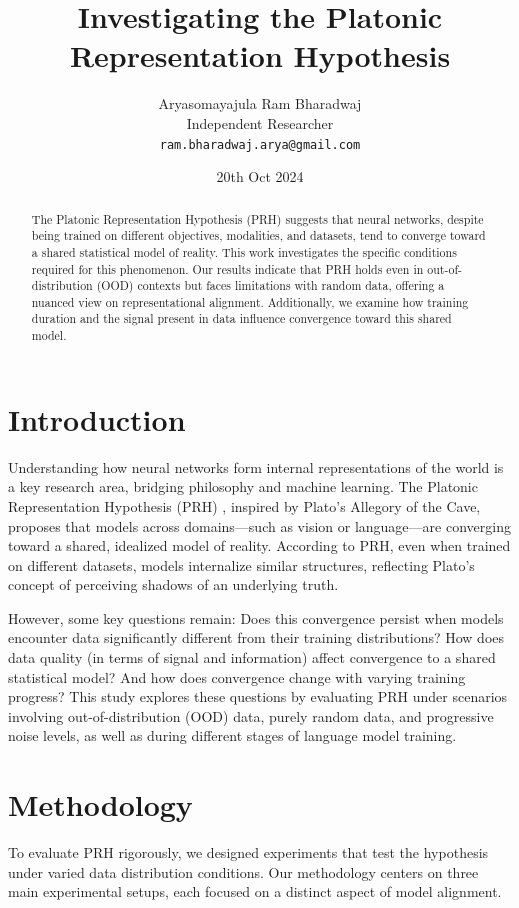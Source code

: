 \documentclass[10pt,a4paper]{article}
\title{Investigating the Platonic Representation Hypothesis}
\author{Aryasomayajula Ram Bharadwaj\\
Independent Researcher\\
\texttt{ram.bharadwaj.arya@gmail.com}}
\date{20th Oct 2024}
\begin{document}
\maketitle

\begin{abstract}
The Platonic Representation Hypothesis (PRH) \cite{huh2024prh} suggests that neural networks, despite being trained on different objectives, modalities, and datasets, tend to converge toward a shared statistical model of reality. This work investigates the specific conditions required for this phenomenon. Our results indicate that PRH holds even in out-of-distribution (OOD) contexts but faces limitations with random data, offering a nuanced view on representational alignment. Additionally, we examine how training duration and the signal present in data influence convergence toward this shared model.
\end{abstract}

\section{Introduction}
Understanding how neural networks form internal representations of the world is a key research area, bridging philosophy and machine learning. The Platonic Representation Hypothesis (PRH) \cite{huh2024prh}, inspired by Plato’s Allegory of the Cave, proposes that models across domains—such as vision or language—are converging toward a shared, idealized model of reality. According to PRH, even when trained on different datasets, models internalize similar structures, reflecting Plato’s concept of perceiving shadows of an underlying truth.

However, some key questions remain: Does this convergence persist when models encounter data significantly different from their training distributions? How does data quality (in terms of signal and information) affect convergence to a shared statistical model? And how does convergence change with varying training progress? This study explores these questions by evaluating PRH under scenarios involving out-of-distribution (OOD) data, purely random data, and progressive noise levels, as well as during different stages of language model training.

\section{Methodology}
To evaluate PRH rigorously, we designed experiments that test the hypothesis under varied data distribution conditions. Our methodology centers on three main experimental setups, each focused on a distinct aspect of model alignment.
\end{document}
